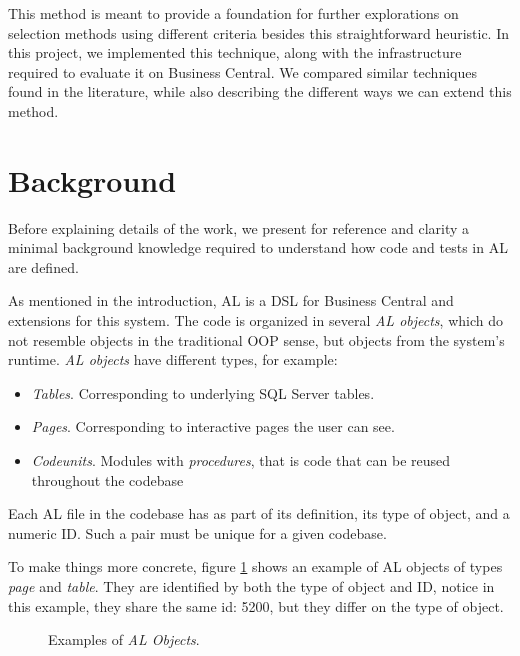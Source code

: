 \documentclass{article}
\begin{document}
This method is meant to provide a foundation for further explorations on selection methods using different criteria besides this straightforward heuristic. In this project, we implemented this technique, along with the infrastructure required to evaluate it on Business Central. We compared similar techniques found in the literature, while also describing the different ways we can extend this method.

\section{Background}\label{section:al-background-info}
Before explaining details of the work, we present for reference and clarity a minimal background knowledge required to understand how code and tests in AL are defined.

As mentioned in the introduction, AL is a DSL for Business Central and extensions for this system. The code is organized in several \emph{AL objects}, which do not resemble objects in the traditional OOP sense, but objects from the system's runtime. \emph{AL objects} have different types, for example:
\begin{itemize}
\item \emph{Tables}. Corresponding to underlying SQL Server tables.
\item \emph{Pages}. Corresponding to interactive pages the user can see.
\item \emph{Codeunits}. Modules with \emph{procedures}, that is code that can be reused throughout the codebase
\end{itemize}

Each AL file in the codebase has as part of its definition, its type of object, and a numeric ID. Such a pair must be unique for a given codebase.

To make things more concrete, figure \ref{fig:al-examples} shows an example of AL objects of types \emph{page} and \emph{table}. They are identified by both the type of object and ID, notice in this example, they share the same id: 5200, but they differ on the type of object.
\begin{figure}[H]
  \centering
  \qquad
  \caption{Examples of \emph{AL Objects}. }
  \label{fig:al-examples}
\end{figure}
\end{document}
